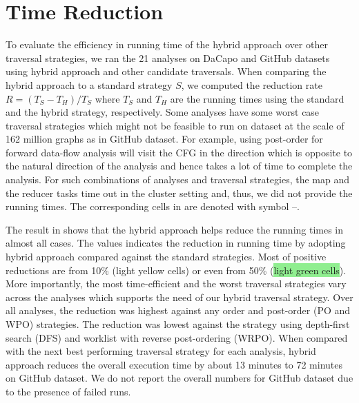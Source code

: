 \section{Time Reduction}



To evaluate the efficiency in running time of the hybrid approach over other 
traversal strategies, we ran the 21 analyses on DaCapo and GitHub 
datasets using hybrid approach and other candidate traversals. When comparing 
the hybrid approach to a standard strategy $S$, we computed the reduction 
rate $R=(T_S-T_H)/T_S$ where $T_S$ and $T_H$ are the running times using the 
standard and the hybrid strategy, respectively. 
%
Some analyses have some worst case traversal strategies which might not be 
feasible to run on dataset at the scale of 162 million graphs as in 
GitHub dataset. For example, using post-order for forward data-flow 
analysis will visit the CFG in the direction which is opposite to the 
natural direction of the analysis and hence takes a lot of time to complete 
the analysis. For such combinations of analyses and traversal strategies, the 
map and the reducer tasks time out in the cluster setting and, thus, we did 
not provide the running times. 
The corresponding cells in  are denoted with symbol --.
%

The result in  shows that the hybrid approach 
helps reduce the running times in almost all cases. The values indicates the 
reduction in running time by adopting hybrid approach compared against the standard strategies. 
Most of positive reductions are from 10\% (\colorbox{lightblack}{light yellow 
cells}) or even from 50\% (\colorbox{lightgreen}{light green cells}). More 
importantly, the most time-efficient and the worst traversal strategies vary 
across the analyses which supports the need of our hybrid traversal strategy.
%
Over all analyses, the reduction was highest against any order and 
post-order (PO and WPO) strategies. The reduction was lowest against the strategy 
using depth-first search (DFS) and worklist with reverse post-ordering (WRPO). 
When compared with the next best performing traversal strategy for each analysis, hybrid approach reduces the overall execution time by 
about 13 minutes to 72 minutes on GitHub dataset. We do not 
report the overall numbers for GitHub dataset due to the presence of failed 
runs.

